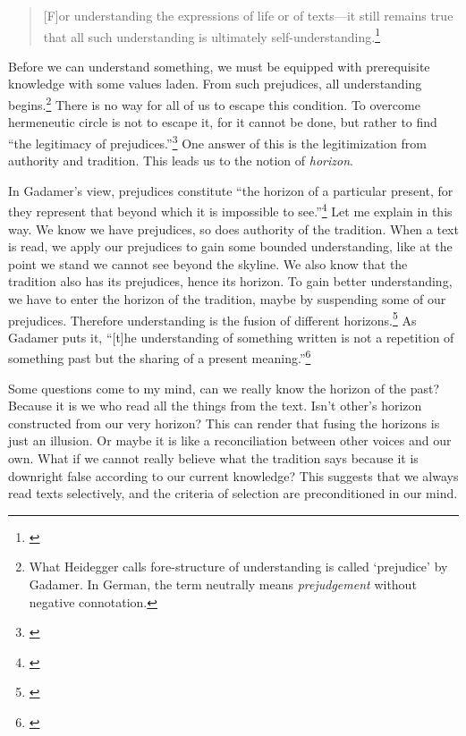 \begin{quote}
[F]or understanding the expressions of life or of texts---it still remains true that all such understanding is ultimately self-understanding.\footnote{\citealp[p.~251]{gadamer:truth}}
\end{quote}

Before we can understand something, we must be equipped with prerequisite knowledge with some values laden. From such prejudices, all understanding begins.\footnote{What Heidegger calls fore-structure of understanding is called `prejudice' by Gadamer. In German, the term neutrally means \emph{prejudgement} without negative connotation.} There is no way for all of us to escape this condition. To overcome hermeneutic circle is not to escape it, for it cannot be done, but rather to find ``the legitimacy of prejudices.''\footnote{\citealp[p.~278]{gadamer:truth}} One answer of this is the legitimization from authority and tradition. This leads us to the notion of \emph{horizon}.

In Gadamer's view, prejudices constitute ``the horizon of a particular present, for they represent that beyond which it is impossible to see.''\footnote{\citealp[p.~305]{gadamer:truth}} Let me explain in this way. We know we have prejudices, so does authority of the tradition. When a text is read, we apply our prejudices to gain some bounded understanding, like at the point we stand we cannot see beyond the skyline. We also know that the tradition also has its prejudices, hence its horizon. To gain better understanding, we have to enter the horizon of the tradition, maybe by suspending some of our prejudices. Therefore understanding is the fusion of different horizons.\footnote{\citealp[p.~305]{gadamer:truth}} As Gadamer puts it, ``[t]he understanding of something written is not a repetition of something past but the sharing of a present meaning.''\footnote{\citealp[p.~394]{gadamer:truth}}

Some questions come to my mind, can we really know the horizon of the past? Because it is we who read all the things from the text. Isn't other's horizon constructed from our very horizon? This can render that fusing the horizons is just an illusion. Or maybe it is like a reconciliation between other voices and our own. What if we cannot really believe what the tradition says because it is downright false according to our current knowledge? This suggests that we always read texts selectively, and the criteria of selection are preconditioned in our mind.


